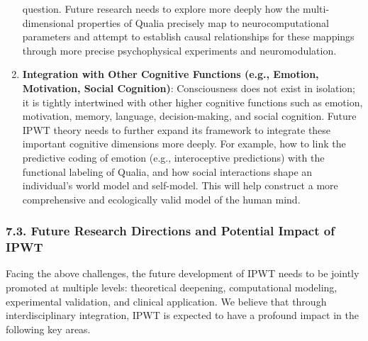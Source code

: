 \documentclass[
  a4paper]{article}
\begin{document}
\begin{enumerate}
  question. Future research needs to explore more deeply how the
  multi-dimensional properties of Qualia precisely map to
  neurocomputational parameters and attempt to establish causal
  relationships for these mappings through more precise psychophysical
  experiments and neuromodulation.
\item
  \textbf{Integration with Other Cognitive Functions (e.g., Emotion,
  Motivation, Social Cognition)}: Consciousness does not exist in
  isolation; it is tightly intertwined with other higher cognitive
  functions such as emotion, motivation, memory, language,
  decision-making, and social cognition. Future IPWT theory needs to
  further expand its framework to integrate these important cognitive
  dimensions more deeply. For example, how to link the predictive coding
  of emotion (e.g., interoceptive predictions) with the functional
  labeling of Qualia, and how social interactions shape an individual's
  world model and self-model. This will help construct a more
  comprehensive and ecologically valid model of the human mind.
\end{enumerate}

\subsubsection{7.3. Future Research Directions and Potential Impact of
IPWT}\label{future-research-directions-and-potential-impact-of-ipwt}

Facing the above challenges, the future development of IPWT needs to be
jointly promoted at multiple levels: theoretical deepening,
computational modeling, experimental validation, and clinical
application. We believe that through interdisciplinary integration, IPWT
is expected to have a profound impact in the following key areas.
\end{document}
